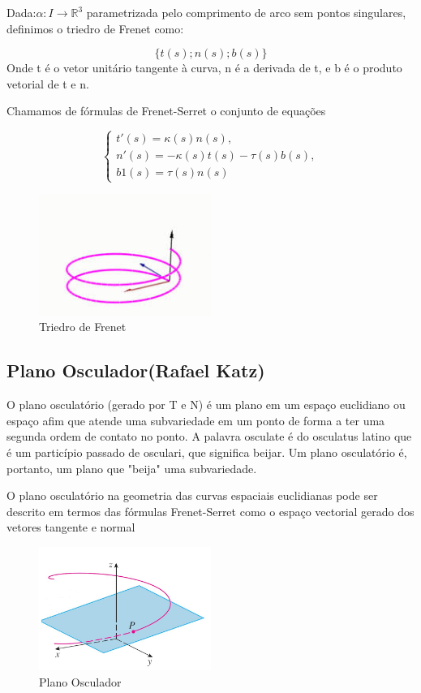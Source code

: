 \documentclass[a4paper]{article}
\begin{document}
Dada:$\alpha: I \rightarrow \mathbb{R}^3$ parametrizada pelo comprimento de arco sem pontos singulares, definimos o triedro de Frenet como:

\[\{t(s);n(s);b(s)\}\]
Onde t é o vetor unitário  tangente à curva, n é a derivada de t, e  b é o produto vetorial de t e n.


Chamamos de fórmulas de Frenet-Serret o conjunto de equações

\[ \begin{cases}

t'(s) =\kappa(s)n(s),\\

n'(s) =-\kappa(s)t(s) -\tau(s)b(s),\\ 

 b1(s) =\tau(s)n(s)
\end{cases} \]

\begin{figure}[h!]
  \caption{Triedro de Frenet}
  \centering
  \includegraphics[width=0.5\textwidth]{triedro_frenet.png}
\end{figure}

\subsection{Plano Osculador(Rafael Katz)}
O plano osculatório (gerado por T e N) é um plano em um espaço euclidiano ou espaço afim que atende uma subvariedade em um ponto de forma a ter uma segunda ordem de contato no ponto. A palavra osculate é do osculatus latino que é um particípio passado de osculari, que significa beijar. Um plano osculatório é, portanto, um plano que "beija" uma subvariedade.

O plano osculatório na geometria das curvas espaciais euclidianas pode ser descrito em termos das fórmulas Frenet-Serret como o espaço vectorial gerado dos vetores tangente e normal

\begin{figure}[h!]
  \caption{Plano Osculador}
  \centering
  \includegraphics[width=0.5\textwidth]{plano_osculador.png}
\end{figure}
\end{document}

